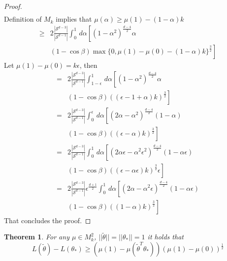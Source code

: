 \documentclass[twoside]{article} \usepackage{aistats2017}
\newtheorem{theorem}{Theorem}
\begin{document}
\begin{proof}
\begin{align*}
    \end{align*}
    Definition of $M_k$ implies that $\mu(\alpha)\geq \mu(1)-(1-\alpha)k$
    \begin{align*}
        \geq&2\frac{|\mathcal{S}^{d-3}|}{|\mathcal{S}^{d-1}|}\int_{0}^{1}\,d\alpha\left[(1-\alpha^2)^{\frac{d-4}{2}}\alpha\right.\\
    &\left.(1-\cos{\beta})\max\{0,\mu(1)-\mu(0)-(1-\alpha)k\}^\frac{3}{2}\right]
    \end{align*}
Let $\mu(1)-\mu(0) =k\epsilon$, then
    \begin{align*}
        =&2\frac{|\mathcal{S}^{d-3}|}{|\mathcal{S}^{d-1}|}\int_{1-\epsilon}^{1}\,d\alpha\left[(1-\alpha^2)^{\frac{d-4}{2}}\alpha\right.\\
    &\left.(1-\cos{\beta})((\epsilon-1+\alpha)k)^\frac{3}{2}\right]\\
        =&2\frac{|\mathcal{S}^{d-3}|}{|\mathcal{S}^{d-1}|}\int_{0}^{\epsilon}\,d\alpha\left[(2\alpha-\alpha^2)^{\frac{d-4}{2}}(1-\alpha)\right.\\
    &\left.(1-\cos{\beta})((\epsilon-\alpha)k)^\frac{3}{2}\right]\\
    =&2\frac{|\mathcal{S}^{d-3}|}{|\mathcal{S}^{d-1}|}\int_{0}^{1}\,d\alpha\left[(2\alpha\epsilon-\alpha^2\epsilon^2)^{\frac{d-4}{2}}(1-\alpha\epsilon)\right.\\
    &\left.(1-\cos{\beta})((\epsilon-\alpha\epsilon)k)^\frac{3}{2}\epsilon\right]\\
    =&2\frac{|\mathcal{S}^{d-3}|}{|\mathcal{S}^{d-1}|}\epsilon^{\frac{d+1}{2}}\int_{0}^{1}\,d\alpha\left[(2\alpha-\alpha^2\epsilon)^{\frac{d-4}{2}}(1-\alpha\epsilon)\right.\\
    &\left.(1-\cos{\beta})((1-\alpha)k)^\frac{3}{2}\right]
    \end{align*}
    That concludes the proof.
\end{proof}
\begin{theorem}
For any $\mu \in M_k^2$, $||\tilde{\theta}||=||\theta_*||=1$ it holds that
$$L(\tilde{\theta})-L(\theta_*) \geq (\mu(1)-\mu(\tilde{\theta}^T\theta_*) )(\mu(1)-\mu(0))^{\frac{1}{2}}$$
\end{theorem}
\end{document}
